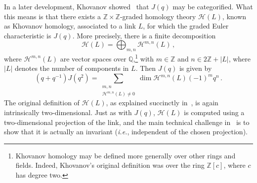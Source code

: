 \documentclass[11pt]{article}
\numberwithin{equation}{section}
\begin{document}
In a later development, Khovanov showed~\cite{khovanov2000} that $J(q)$ may be categorified.
What this means is that there exists a $\mathbb{Z} \times \mathbb{Z}$-graded homology theory $\mathcal{H}(L)$, known as Khovanov homology, associated to a link $L$, for which the graded Euler characteristic is $J(q)$.
More precisely, there is a finite decomposition
\begin{equation}
    \mathcal{H}(L) = \bigoplus_{m,n} \mathcal{H}^{m,n}(L) \,,
\label{eq:jones-from-khovanov}
\end{equation}
where $\mathcal{H}^{m,n}(L)$ are vector spaces over $\mathbb{Q}$,\footnote{Khovanov homology may be defined more generally over other rings and fields.  Indeed, Khovanov's original definition was over the ring $\mathbb{Z}[c]$, where $c$ has degree two.}   with $m \in \mathbb{Z}$ and $n \in 2\mathbb{Z} + |L|$, where $|L|$ denotes the number of components in $L$.
Then $J(q)$ is given by
\begin{equation}
    (q+q^{-1})J(q^2)  = \sum_{\substack{m,n\\\mathcal{H}^{m,n}(L) \neq 0}} \dim \mathcal{H}^{m,n}(L) (-1)^m q^n \,.
\end{equation}
The original definition of $\mathcal{H}(L)$, as explained succinctly in~\cite{Bar_Natan_2002}, is again intrinsically two-dimensional.
Just as with $J(q)$, $\mathcal{H}(L)$ is computed using a two-dimensional projection of the link, and the main technical challenge in~\cite{khovanov2000} is to show that it is actually an invariant (\textit{i.e.}, independent of the chosen projection).
\end{document}
